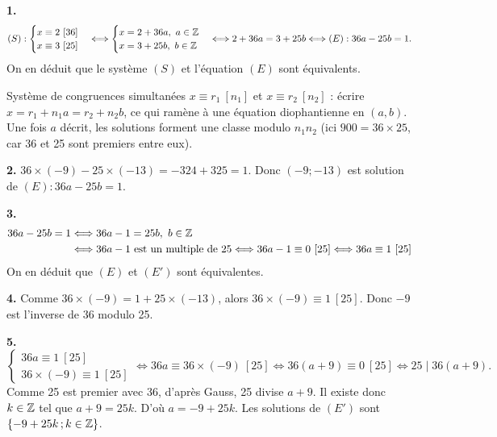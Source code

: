\documentclass[11pt]{article}
\begin{document}


\textbf{1.}
\[ (S) : \begin{cases} x \equiv 2\ [36] \\ x \equiv 3\ [25] \end{cases} \Longleftrightarrow \begin{cases} x = 2 + 36a,\ a \in \mathbb{Z} \\ x = 3 + 25b,\ b \in \mathbb{Z} \end{cases} \Longleftrightarrow 2 + 36a = 3 + 25b \Longleftrightarrow (E) : 36a - 25b = 1. \]
On en déduit que le système $(S)$ et l'équation $(E)$ sont équivalents.

\begin{methode}
Système de congruences simultanées $x \equiv r_1\ [n_1]$ et
$x \equiv r_2\ [n_2]$ : écrire $x = r_1 + n_1 a = r_2 + n_2 b$, ce qui
ramène à une équation diophantienne en $(a, b)$. Une fois $a$ décrit,
les solutions forment une classe modulo $n_1 n_2$ (ici $900 = 36
\times 25$, car 36 et 25 sont premiers entre eux).
\end{methode}

\textbf{2.} $36 \times (-9) - 25 \times (-13) = -324 + 325 = 1$. Donc $(-9;-13)$ est solution de $(E) : 36a - 25b = 1$.

\textbf{3.}
\begin{align*}
36a - 25b = 1 &\Longleftrightarrow 36a - 1 = 25b,\ b \in \mathbb{Z} \\
&\Longleftrightarrow 36a - 1 \text{ est un multiple de } 25 \Longleftrightarrow 36a - 1 \equiv 0\ [25] \Longleftrightarrow 36a \equiv 1\ [25]
\end{align*}
On en déduit que $(E)$ et $(E')$ sont équivalentes.

\textbf{4.} Comme $36 \times (-9) = 1 + 25 \times (-13)$, alors $36 \times (-9) \equiv 1\ [25]$. Donc $-9$ est l'inverse de 36 modulo 25.

\textbf{5.}
\[ \begin{cases} 36a \equiv 1\ [25] \\ 36 \times (-9) \equiv 1\ [25] \end{cases} \Longleftrightarrow 36a \equiv 36 \times (-9)\ [25] \Longleftrightarrow 36(a + 9) \equiv 0\ [25] \Longleftrightarrow 25 \mid 36(a + 9). \]
Comme 25 est premier avec 36, d'après Gauss, 25 divise $a + 9$. Il existe donc $k \in \mathbb{Z}$ tel que $a + 9 = 25k$. D'où $a = -9 + 25k$. Les solutions de $(E')$ sont $\{-9 + 25k\,;k \in \mathbb{Z}\}$.
\end{document}

